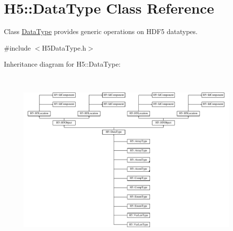 \hypertarget{class_h5_1_1_data_type}{}\section{H5\+:\+:Data\+Type Class Reference}
\label{class_h5_1_1_data_type}


Class \hyperlink{class_h5_1_1_data_type}{Data\+Type} provides generic operations on H\+D\+F5 datatypes.  




{\ttfamily \#include $<$H5\+Data\+Type.\+h$>$}

Inheritance diagram for H5\+:\+:Data\+Type\+:\begin{figure}[H]
\begin{center}
\leavevmode
\includegraphics[height=9.130435cm]{class_h5_1_1_data_type}
\end{center}
\end{figure}
